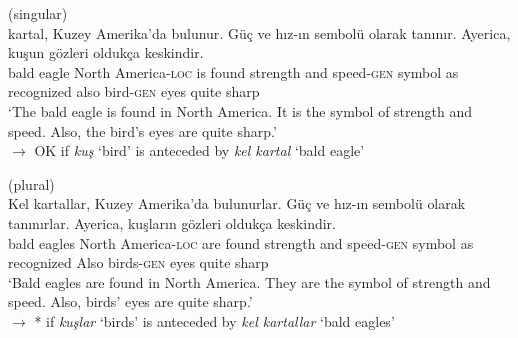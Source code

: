 \documentclass[output=paper,
modfonts
]{langscibook}
\begin{document}
	\ea \label{ex:despic:50}
	 (singular) \\
	 {kartal}, {Kuzey} {Amerika'da} {bulunur}. {G\"u\c c} {ve} {h\i z-\i n}{ sembol\"u} {olarak} {tan\i n\i r}. {Ayerica}, {ku\c sun} {g\"ozleri} {olduk\c ca} {keskindir}. \\
	bald eagle North America-\textsc{loc} {is found} strength and speed-\textsc{gen} symbol as recognized also bird-\textsc{gen} eyes quite sharp \\
	\glt `The bald eagle is found in North America. It is the symbol of strength and speed. Also, the bird's eyes are quite sharp.' \\
	$\rightarrow$ OK if \textit{ku\c s} `bird' is anteceded by \textit{kel kartal} `bald eagle'
	\z 
	
	\ea \label{ex:despic:51}
	 (plural) \\
	\gll 
	{Kel} {kartallar}, {Kuzey} {Amerika'da} {bulunurlar}. {G\"u\c c} {ve} {h\i z-\i n} {sembol\"u} {olarak} {tan\i n\i rlar.} {Ayerica}, {ku\c slar\i n} {g\"ozleri} {olduk\c ca} {keskindir}. \\
	bald eagles North America-\textsc{loc} {are found} strength and speed-\textsc{gen} symbol as recognized Also birds-\textsc{gen} eyes quite sharp \\
	\glt `Bald eagles are found in North America. They are the symbol of strength and speed. Also, birds' eyes are quite sharp.' \\
	$\rightarrow$ * if \textit{ku\c slar} `birds' is anteceded by \textit{kel kartallar} `bald eagles'
	\z 
	
\end{document}
